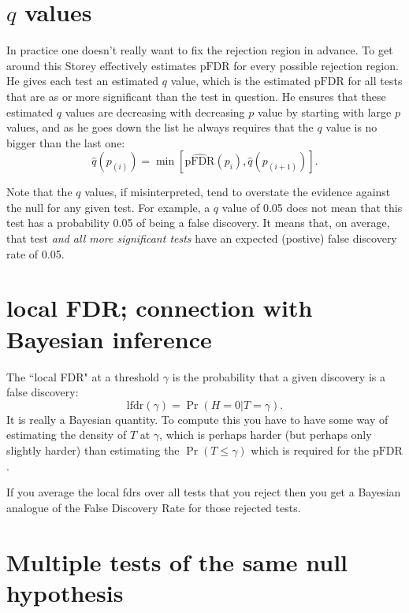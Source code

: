 \documentclass[times,11pt]{article}
\def\pFDR{\text{pFDR}}
\begin{document}
\section{$q$ values}

In practice one doesn't really want to fix the rejection region in advance. To get around this Storey effectively estimates $\pFDR$ for every possible rejection region. He gives each test an estimated $q$ value, which is the estimated $\pFDR$ for all tests that are as or more significant than the test in question. He ensures that these estimated $q$ values are decreasing with decreasing $p$ value by starting with large $p$ values, and as he goes down the list he always requires that the $q$ value is no bigger than the last one:
\begin{equation}
\hat{q}(p_{(i)}) = \min [\widehat{\pFDR}(p_{i}) , \hat{q}(p_{(i+1)}) ].
\end{equation}

Note that the $q$ values, if misinterpreted, tend to overstate the evidence against the null for any given test. For example, a $q$ value of 0.05 does not mean that this test has a probability 0.05 of being a false discovery. It means that, on average, that test {\it and all more significant tests} have an expected (postive) false discovery rate of 0.05.

\section{local FDR; connection with Bayesian inference}

The ``local FDR" at a threshold $\gamma$ is the probability that a given discovery is a false discovery: 
\begin{equation}
\text{lfdr}(\gamma) = \Pr(H = 0 | T=\gamma).
\end{equation}
It is really a Bayesian quantity. 
To compute this you have to have some way of estimating the density of $T$ at $\gamma$, which is perhaps harder (but perhaps only slightly harder) than estimating the $\Pr(T \leq \gamma)$ which is
required for the $\pFDR$.

If you average the local fdrs over all tests that you reject then you get a Bayesian analogue of the False Discovery Rate for those rejected tests.

\section{Multiple tests of the same null hypothesis}
\end{document}
